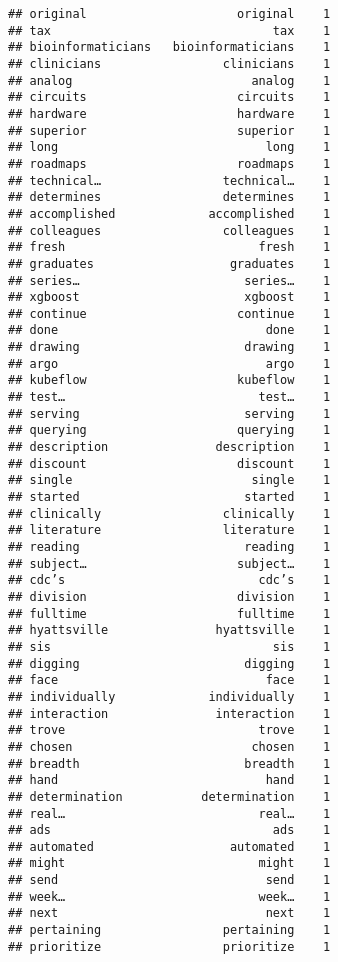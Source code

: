 \documentclass[]{article}
\begin{document}
\begin{verbatim}
## original                     original    1
## tax                               tax    1
## bioinformaticians   bioinformaticians    1
## clinicians                 clinicians    1
## analog                         analog    1
## circuits                     circuits    1
## hardware                     hardware    1
## superior                     superior    1
## long                             long    1
## roadmaps                     roadmaps    1
## technical…                 technical…    1
## determines                 determines    1
## accomplished             accomplished    1
## colleagues                 colleagues    1
## fresh                           fresh    1
## graduates                   graduates    1
## series…                       series…    1
## xgboost                       xgboost    1
## continue                     continue    1
## done                             done    1
## drawing                       drawing    1
## argo                             argo    1
## kubeflow                     kubeflow    1
## test…                           test…    1
## serving                       serving    1
## querying                     querying    1
## description               description    1
## discount                     discount    1
## single                         single    1
## started                       started    1
## clinically                 clinically    1
## literature                 literature    1
## reading                       reading    1
## subject…                     subject…    1
## cdc’s                           cdc’s    1
## division                     division    1
## fulltime                     fulltime    1
## hyattsville               hyattsville    1
## sis                               sis    1
## digging                       digging    1
## face                             face    1
## individually             individually    1
## interaction               interaction    1
## trove                           trove    1
## chosen                         chosen    1
## breadth                       breadth    1
## hand                             hand    1
## determination           determination    1
## real…                           real…    1
## ads                               ads    1
## automated                   automated    1
## might                           might    1
## send                             send    1
## week…                           week…    1
## next                             next    1
## pertaining                 pertaining    1
## prioritize                 prioritize    1

\end{verbatim}
\end{document}
